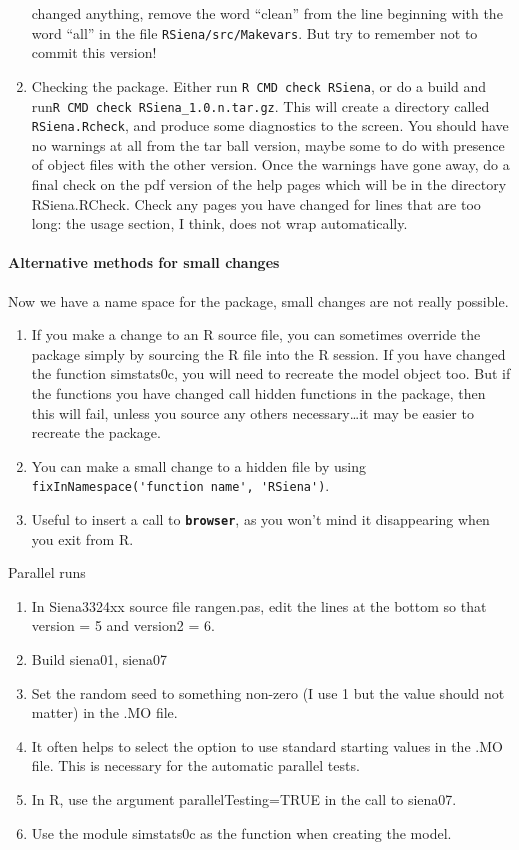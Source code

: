 \documentclass[12pt, a4paper]{article}
\makeatletter
\renewcommand{\=}{\,=\,}
\newcommand{\+}{\,+\,}
\newcommand{\sfn}[1]{\textbf{\texttt{#1}}}
\renewcommand{\section}{\@startsection{section}{1}
                {0pt}{\baselineskip}{0.5\baselineskip}
                {\centering\sffamily} }
\makeatother
\begin{document}
\begin{enumerate}
  changed anything, remove the word ``clean'' from the line beginning with the
  word ``all'' in the file \verb|RSiena/src/Makevars|. But try to remember not
  to commit this version!
\item Checking the package. Either run \verb|R CMD check RSiena|, or do a build
  and run\verb|R CMD check RSiena_1.0.n.tar.gz|. This will create a directory
  called \verb|RSiena.Rcheck|, and produce some diagnostics to the screen. You
  should have no warnings at all from the tar ball version, maybe some to do
  with presence of object files with the other version. Once the warnings have
  gone away, do a final check on the pdf version of the help pages which will be
  in the directory RSiena.RCheck. Check any pages you have changed for lines
  that are too long: the usage section, I think, does not wrap automatically. 
\end{enumerate}
\paragraph{Alternative methods for small changes}
Now we have a \textsf{name space} for the package, small changes are not really
possible.
\begin{enumerate}
\item If you make a change to an R source file, you can sometimes override the
  package simply by sourcing the R file into the R session. If you have changed
  the function \textsf{simstats0c}, you will need to recreate the model object
  too. But if the functions you have changed call hidden functions in the
  package, then this will fail, unless you source any others necessary\ldots it
  may be easier to recreate the package.
\item You can make a small change to a hidden file by using
\verb|fixInNamespace('function name', 'RSiena')|.
\item Useful to insert a call to \sfn{browser}, as you won't mind it
  disappearing when you exit from R.
\end{enumerate}
\section{Parallel runs}
\begin{enumerate}
\item In Siena3324xx source file \textsf{rangen.pas}, edit the lines at the
  bottom so that \textsf{version = 5} and \textsf{version2 = 6}.
\item Build siena01, siena07
\item Set the random seed to something non-zero (I use 1 but the value
  should not matter) in the .MO file.
\item It often helps to select the option to use standard starting values in the
  .MO file. This is necessary for the automatic parallel tests.
\item In R, use the argument \textsf{parallelTesting=TRUE} in the call to
  \textsf{siena07}.
\item Use the module \textsf{simstats0c} as the function when creating the
  model.
\end{enumerate}
\end{document}

